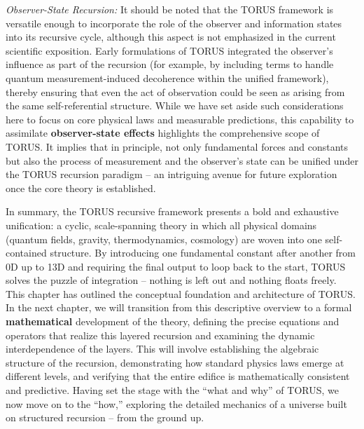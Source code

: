 \documentclass[
]{article}
\begin{document}
\emph{Observer-State Recursion:} It should be noted that the TORUS
framework is versatile enough to incorporate the role of the observer
and information states into its recursive cycle, although this aspect is
not emphasized in the current scientific exposition. Early formulations
of TORUS integrated the observer's influence as part of the recursion
(for example, by including terms to handle quantum measurement-induced
decoherence within the unified framework), thereby ensuring that even
the act of observation could be seen as arising from the same
self-referential structure. While we have set aside such considerations
here to focus on core physical laws and measurable predictions, this
capability to assimilate \textbf{observer-state effects} highlights the
comprehensive scope of TORUS. It implies that in principle, not only
fundamental forces and constants but also the process of measurement and
the observer's state can be unified under the TORUS recursion paradigm
-- an intriguing avenue for future exploration once the core theory is
established.

In summary, the TORUS recursive framework presents a bold and exhaustive
unification: a cyclic, scale-spanning theory in which all physical
domains (quantum fields, gravity, thermodynamics, cosmology) are woven
into one self-contained structure. By introducing one fundamental
constant after another from 0D up to 13D and requiring the final output
to loop back to the start, TORUS solves the puzzle of integration --
nothing is left out and nothing floats freely. This chapter has outlined
the conceptual foundation and architecture of TORUS. In the next
chapter, we will transition from this descriptive overview to a formal
\textbf{mathematical} development of the theory, defining the precise
equations and operators that realize this layered recursion and
examining the dynamic interdependence of the layers. This will involve
establishing the algebraic structure of the recursion, demonstrating how
standard physics laws emerge at different levels, and verifying that the
entire edifice is mathematically consistent and predictive. Having set
the stage with the ``what and why'' of TORUS, we now move on to the
``how,'' exploring the detailed mechanics of a universe built on
structured recursion -- from the ground up.
\end{document}

